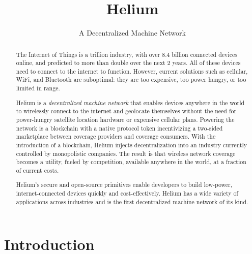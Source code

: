 \documentclass[10pt, nonatbib, nocopyrightspace, reprint]{sigplanconf}
\begin{document}
\setlength{\pdfpageheight}{\paperheight}
\setlength{\pdfpagewidth}{\paperwidth}

\title{Helium}
\subtitle{A Decentralized Machine Network}

\maketitle

\begin{abstract}
The Internet of Things is a  trillion industry, with over 8.4 billion connected devices online, and predicted to more than double over the next 2 years. All of these devices need to connect to the internet to function. However, current solutions such as cellular, WiFi, and Bluetooth are suboptimal: they are too expensive, too power hungry, or too limited in range.

Helium is a \emph{decentralized machine network} that enables devices anywhere in the world to wirelessly connect to the internet and geolocate themselves without the need for power-hungry satellite location hardware or expensive cellular plans. Powering the network is a blockchain with a native protocol token incentivizing a two-sided marketplace between coverage providers and coverage consumers. With the introduction of a blockchain, Helium injects decentralization into an industry currently controlled by monopolistic companies. The result is that wireless network coverage becomes a utility, fueled by competition, available anywhere in the world, at a fraction of current costs.

Helium's secure and open-source primitives enable developers to build low-power, internet-connected devices quickly and cost-effectively. Helium has a wide variety of applications across industries and is the first decentralized machine network of its kind.
\end{abstract}



\section{Introduction}
\end{document}
